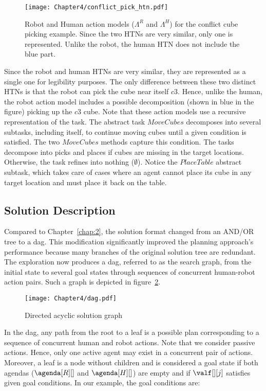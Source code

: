 \begin{figure}[h]
    \center
    \texttt{[image: Chapter4/conflict\_pick\_htn.pdf]}
    \caption{Robot and Human action models ($\Lambda^R$ and $\Lambda^H$) for the conflict cube picking example. Since the two HTNs are very similar, only one is represented. Unlike the robot, the human HTN does not include the blue part.}
    \label{fig:conflict_pick_htn}
\end{figure}

Since the robot and human HTNs are very similar, they are represented as a single one for legibility purposes. The only difference between these two distinct HTNs is that the robot can pick the cube near itself $c3$. Hence, unlike the human, the robot action model includes a possible decomposition (shown in blue in the figure) picking up the $c3$ cube. Note that these action models use a recursive representation of the task. The abstract task $MoveCubes$ decomposes into several subtasks, including itself, to continue moving cubes until a given condition is satisfied. The two $MoveCubes$ methods capture this condition. The tasks decompose into picks and places if cubes are missing in the target locations. Otherwise, the task refines into nothing ($\emptyset$). Notice the $PlaceTable$ abstract subtask, which takes care of cases where an agent cannot place its cube in any target location and must place it back on the table. 

\subsection*{Solution Description}

Compared to Chapter~\ref{chap:2}, the solution format changed from an AND/OR tree to a \acrfull{dag}. This modification significantly improved the planning approach's performance because many branches of the original solution tree are redundant. The exploration now produces a \acrfull{dag}, referred to as the search graph, from the initial state to several goal states through sequences of concurrent human-robot action pairs. Such a graph is depicted in figure~\ref{fig:dag}. 

\begin{figure}[h]
    \centering
    \texttt{[image: Chapter4/dag.pdf]}
    \caption{Directed acyclic solution graph}
    \label{fig:dag}
\end{figure}

In the \acrshort{dag}, any path from the root to a leaf is a possible plan corresponding to a sequence of concurrent human and robot actions. Note that we consider passive actions. Hence, only one active agent may exist in a concurrent pair of actions. Moreover, a leaf is a node without children and is considered a goal state if both agendas ($\agenda[R][]$ and $\agenda[H][]$) are empty and if $\valf[][j]$ satisfies given goal conditions. In our example, the goal conditions are:


